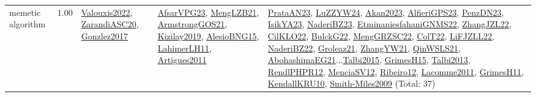 {\begin{longtable}{p{3cm}r>{\raggedright\arraybackslash}p{6cm}>{\raggedright\arraybackslash}p{6cm}>{\raggedright\arraybackslash}p{8cm}}
\index{memetic algorithm}\index{Algorithms!memetic algorithm}memetic algorithm &  1.00 & \hyperref[detail:Valouxis2022]{Valouxis2022}, \hyperref[detail:ZarandiASC20]{ZarandiASC20}, \hyperref[detail:Gonzlez2017]{Gonzlez2017} & \hyperref[detail:AfsarVPG23]{AfsarVPG23}, \hyperref[detail:MengLZB21]{MengLZB21}, \hyperref[detail:ArmstrongGOS21]{ArmstrongGOS21}, \hyperref[detail:Kizilay2019]{Kizilay2019}, \hyperref[detail:AlesioBNG15]{AlesioBNG15}, \hyperref[detail:LahimerLH11]{LahimerLH11}, \hyperref[detail:Artigues2011]{Artigues2011} & \hyperref[detail:PrataAN23]{PrataAN23}, \hyperref[detail:LuZZYW24]{LuZZYW24}, \hyperref[detail:Akan2023]{Akan2023}, \hyperref[detail:AlfieriGPS23]{AlfieriGPS23}, \hyperref[detail:PenzDN23]{PenzDN23}, \hyperref[detail:IsikYA23]{IsikYA23}, \hyperref[detail:NaderiBZ23]{NaderiBZ23}, \hyperref[detail:EtminaniesfahaniGNMS22]{EtminaniesfahaniGNMS22}, \hyperref[detail:ZhangJZL22]{ZhangJZL22}, \hyperref[detail:CilKLO22]{CilKLO22}, \hyperref[detail:BulckG22]{BulckG22}, \hyperref[detail:MengGRZSC22]{MengGRZSC22}, \hyperref[detail:ColT22]{ColT22}, \hyperref[detail:LiFJZLL22]{LiFJZLL22}, \hyperref[detail:NaderiBZ22]{NaderiBZ22}, \hyperref[detail:Groleaz21]{Groleaz21}, \hyperref[detail:ZhangYW21]{ZhangYW21}, \hyperref[detail:QinWSLS21]{QinWSLS21}, \hyperref[detail:AbohashimaEG21]{AbohashimaEG21}...\hyperref[detail:Talbi2015]{Talbi2015}, \hyperref[detail:GrimesH15]{GrimesH15}, \hyperref[detail:Talbi2013]{Talbi2013}, \hyperref[detail:RendlPHPR12]{RendlPHPR12}, \hyperref[detail:MenciaSV12]{MenciaSV12}, \hyperref[detail:Ribeiro12]{Ribeiro12}, \hyperref[detail:Lacomme2011]{Lacomme2011}, \hyperref[detail:GrimesH11]{GrimesH11}, \hyperref[detail:KendallKRU10]{KendallKRU10}, \hyperref[detail:Smith-Miles2009]{Smith-Miles2009} (Total: 37)\\

\end{longtable}}
